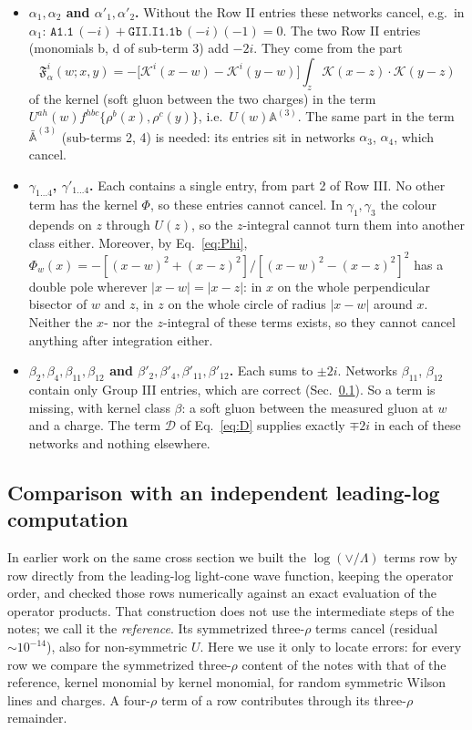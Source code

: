 \documentclass[10pt]{article}
\numberwithin{equation}{section}
\newcommand{\KK}{\mathcal K}
\newcommand{\lab}[1]{\texttt{#1}}
\begin{document}
\begin{itemize}
\item \textbf{$\alpha_1,\alpha_2$ and $\alpha'_1,\alpha'_2$.} Without the Row II entries these networks cancel, e.g.\ in $\alpha_1$: $\lab{A1.1}\,(-i)+\lab{GII.I1.1b}\,(-i)(-1)=0$. The two Row II entries (monomials b, d of sub-term 3) add $-2i$. They come from the part
\begin{equation}
\mathfrak F^i_\alpha(w;x,y)=-\big[\KK^i(x-w)-\KK^i(y-w)\big]\int_z\KK(x-z)\cdot\KK(y-z)
\label{eq:Falpha}
\end{equation}
of the kernel (soft gluon between the two charges) in the term $U^{ah}(w)f^{hbc}\{\rho^b(x),\rho^c(y)\}$, i.e.\ $U(w)\mathbb A^{(3)}$. The same part in the term $\bar{\mathbb A}^{(3)}$ (sub-terms 2, 4) is needed: its entries sit in networks $\alpha_3$, $\alpha_4$, which cancel.
\item \textbf{$\gamma_{1\ldots4}$, $\gamma'_{1\ldots4}$.} Each contains a single entry, from part 2 of Row III. No other term has the kernel $\Phi$, so these entries cannot cancel. In $\gamma_1,\gamma_3$ the colour depends on $z$ through $U(z)$, so the $z$-integral cannot turn them into another class either. Moreover, by Eq.~\eqref{eq:Phi}, $\Phi_w(x)=-[(x-w)^2+(x-z)^2]/[(x-w)^2-(x-z)^2]^2$ has a double pole wherever $|x-w|=|x-z|$: in $x$ on the whole perpendicular bisector of $w$ and $z$, in $z$ on the whole circle of radius $|x-w|$ around $x$. Neither the $x$- nor the $z$-integral of these terms exists, so they cannot cancel anything after integration either.
\item \textbf{$\beta_2,\beta_4,\beta_{11},\beta_{12}$ and $\beta'_2,\beta'_4,\beta'_{11},\beta'_{12}$.} Each sums to $\pm2i$. Networks $\beta_{11}$, $\beta_{12}$ contain only Group III entries, which are correct (Sec.~\ref{sec:reference}). So a term is missing, with kernel class $\beta$: a soft gluon between the measured gluon at $w$ and a charge. The term $\mathcal D$ of Eq.~\eqref{eq:D} supplies exactly $\mp2i$ in each of these networks and nothing elsewhere.
\end{itemize}

\subsection{Comparison with an independent leading-log computation}\label{sec:reference}
In earlier work on the same cross section we built the $\log(\vee/\Lambda)$ terms row by row directly from the leading-log light-cone wave function, keeping the operator order, and checked those rows numerically against an exact evaluation of the operator products. That construction does not use the intermediate steps of the notes; we call it the \emph{reference}. Its symmetrized three-$\rho$ terms cancel (residual $\sim10^{-14}$), also for non-symmetric $U$. Here we use it only to locate errors: for every row we compare the symmetrized three-$\rho$ content of the notes with that of the reference, kernel monomial by kernel monomial, for random symmetric Wilson lines and charges. A four-$\rho$ term of a row contributes through its three-$\rho$ remainder.
\end{document}
